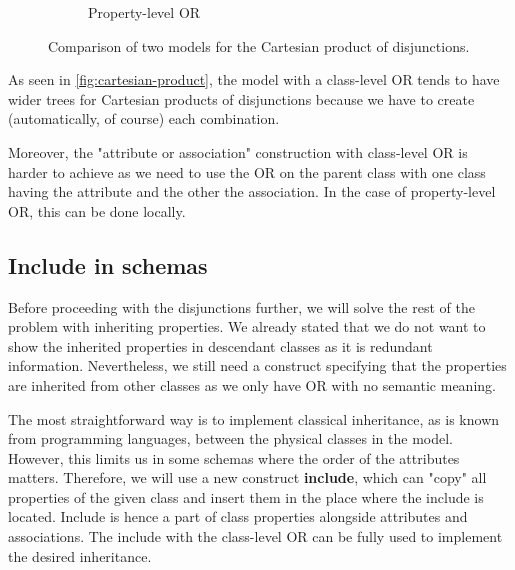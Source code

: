 \begin{figure}[h!]
\begin{subfigure}[b]{.4\textwidth}
    \caption{Property-level OR}
    \label{fig:cartesian-product:property-or}
    \end{subfigure}%
  \caption{Comparison of two models for the Cartesian product of disjunctions.}
  \label{fig:cartesian-product}
\end{figure}

As seen in \autoref{fig:cartesian-product}, the model with a class-level OR tends to have wider trees for Cartesian products of disjunctions because we have to create (automatically, of course) each combination.

Moreover, the "attribute or association" construction with class-level OR is harder to achieve as we need to use the OR on the parent class with one class having the attribute and the other the association. In the case of property-level OR, this can be done locally.

\subsection{Include in schemas}

Before proceeding with the disjunctions further, we will solve the rest of the problem with inheriting properties. We already stated that we do not want to show the inherited properties in descendant classes as it is redundant information. Nevertheless, we still need a construct specifying that the properties are inherited from other classes as we only have OR with no semantic meaning.

The most straightforward way is to implement classical inheritance, as is known from programming languages, between the physical classes in the model. However, this limits us in some schemas where the order of the attributes matters. Therefore, we will use a new construct \textbf{include}, which can "copy" all properties of the given class and insert them in the place where the include is located. Include is hence a part of class properties alongside attributes and associations. The include with the class-level OR can be fully used to implement the desired inheritance.


